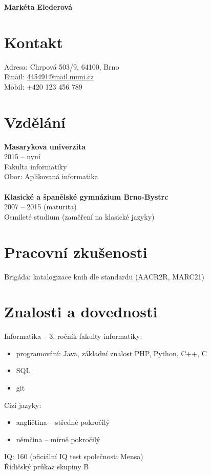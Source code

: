 \documentclass[letterpaper,12pt,oneside]{article}
\begin{document}
\noindent  \LARGE{\textbf{Markéta Elederová}}

\normalsize

\section*{Kontakt}
 Adresa: Chrpová 503/9, 64100, Brno  \\
 Email: \href{mailto:445491@mail.muni.cz}{445491@mail.muni.cz} \\
 Mobil: +420 123 456 789
 
\section*{Vzdělání}
\textbf{Masarykova univerzita} \\
2015 – nyní \\
Fakulta informatiky \\
Obor: Aplikovaná informatika \\
\\
\textbf{Klasické a španělské gymnázium Brno-Bystrc} \\
2007 – 2015 (maturita) \\
Osmileté studium (zaměření na klasické jazyky)

\section*{Pracovní zkušenosti}
Brigáda: katalogizace knih dle standardu (AACR2R, MARC21)
    
\section*{Znalosti a dovednosti}
Informatika – 3. ročník fakulty informatiky:
\begin{itemize}[label={--}, noitemsep]
\item programování: Java, základní znalost PHP, Python, C++, C
\item SQL
\item git
\end{itemize}

\noindent
Cizí jazyky:
\begin{itemize}[label={--},noitemsep]
\item angličtina – středně pokročilý
\item němčina – mírně pokročilý
\end{itemize}

\noindent
IQ: 160 (oficiální IQ test společnosti Mensa) \\
Řidičský průkaz skupiny B
\end{document}
